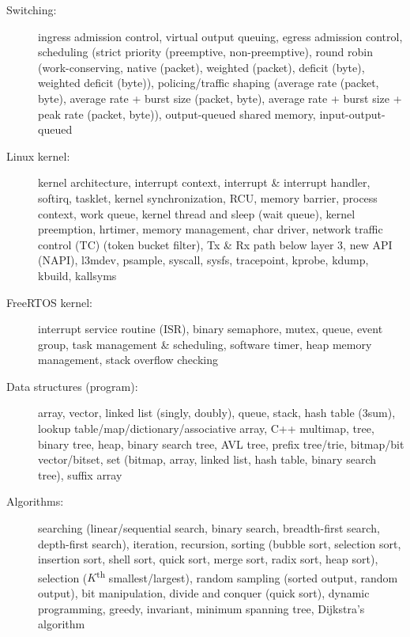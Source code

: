 \documentclass[letterpaper,11pt]{article}
\begin{document}
\begin{description}
\item[Switching:] ingress admission control, virtual output queuing, egress admission control,
scheduling (strict priority (preemptive, non-preemptive),
round robin (work-conserving, native (packet), weighted (packet), deficit (byte), weighted deficit (byte)),
policing/traffic shaping (average rate (packet, byte), average rate + burst size (packet, byte), average rate + burst size + peak rate (packet, byte)),
output-queued shared memory, input-output-queued

\item[Linux kernel:] kernel architecture, interrupt context, interrupt \& interrupt handler, softirq, tasklet, kernel synchronization,
RCU, memory barrier, process context, work queue, kernel thread and sleep (wait queue), kernel preemption, hrtimer, memory management,
char driver, network traffic control (TC) (token bucket filter), Tx \& Rx path below layer 3, new API (NAPI), l3mdev, psample,
syscall, sysfs, tracepoint, kprobe, kdump, kbuild, kallsyms

\item[FreeRTOS kernel:] interrupt service routine (ISR), binary semaphore, mutex, queue, event group, task management \& scheduling, software timer,
heap memory management, stack overflow checking

\item[Data structures (program):] array, vector, linked list (singly, doubly), queue, stack,
hash table (3sum), lookup table/map/dictionary/associative array, C++ multimap,
tree, binary tree, heap, binary search tree, AVL tree, prefix tree/trie,
bitmap/bit vector/bitset, set (bitmap, array, linked list, hash table, binary search tree),
suffix array

\item[Algorithms:] searching (linear/sequential search, binary search, breadth-first search, depth-first search), iteration, recursion,
sorting (bubble sort, selection sort, insertion sort, shell sort, quick sort, merge sort, radix sort, heap sort),
selection ($K$\textsuperscript{th} smallest/largest),
random sampling (sorted output, random output),
bit manipulation, divide and conquer (quick sort), dynamic programming, greedy, invariant, minimum spanning tree, Dijkstra's algorithm


\end{description}
\end{document}
